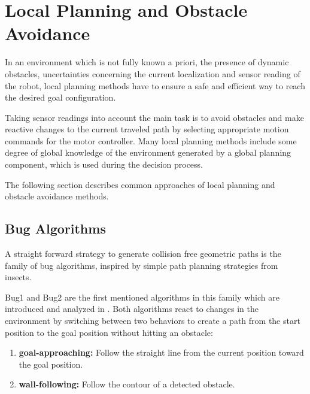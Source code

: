 \chapter{Local Planning and Obstacle Avoidance}\label{ch:local}
In an environment which is not fully known a priori, the presence of dynamic obstacles, uncertainties concerning the current localization and sensor reading of the robot, local planning methods have to ensure a safe and efficient way to reach the desired goal configuration.

Taking sensor readings into account the main task is to avoid obstacles and make reactive changes to the current traveled path by selecting appropriate motion commands for the motor controller.
Many local planning methods include some degree of global knowledge of the environment generated by a global planning component, which is used during the decision process.

The following section describes common approaches of local planning and obstacle avoidance methods. 

\section{Bug Algorithms}
A straight forward strategy to generate collision free geometric paths is the family of bug algorithms, inspired by simple path planning strategies from insects.   

Bug1 and Bug2 are the first mentioned algorithms in this family which are introduced and analyzed in \cite{lumelsky1987path}.
Both algorithms react to changes in the environment by switching between two behaviors to create a path from the start position to the goal position without hitting an obstacle:
\begin{enumerate}
\item {\bf goal-approaching:} Follow the straight line from the current position toward the goal position.
\item {\bf wall-following:} Follow the contour of a detected obstacle.
\end{enumerate}

